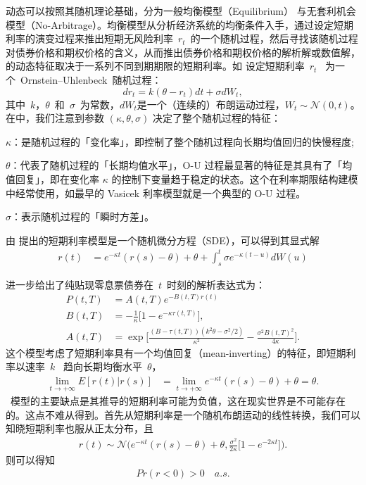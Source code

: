 动态\tsm 可以按照其随机理论基础，分为一般均衡模型（Equilibrium） 与无套利机会模型（No-Arbitrage）。均衡模型从分析经济系统的均衡条件入手，通过设定短期利率的演变过程来推出短期无风险利率~$r_t$~的一个随机过程，然后寻找该随机过程对债券价格和期权价格的含义，从而推出债券价格和期权价格的解析解或数值解，\ts 的动态特征取决于一系列不同到期期限的短期利率。如 设定短期利率~$r_t$~ 为一个~Ornstein–Uhlenbeck~随机过程：
\begin{equation}
  dr_t = k(\theta-r_t)dt + \sigma d W_t, \label{vasicek-model}
\end{equation}
其中~$k$，$\theta$~和~$\sigma$~为常数，$d W_t$是一个（连续的）布朗运动过程，$W_t \sim \mathcal{N} (0, t)$。
在中，我们注意到参数 $(\kappa, \theta, \sigma)$ 决定了整个随机过程的特征：
\begin{compactitem}
 \item $\kappa$：是随机过程的「变化率」，即控制了整个随机过程向长期均值回归的快慢程度;
 \item $\theta$：代表了随机过程的「长期均值水平」，O-U 过程最显著的特征是其具有了「均值回复」，即在变化率 $\kappa$ 的控制下变量趋于稳定的状态。这个在利率期限结构建模中经常使用，如最早的 Vasicek 利率模型就是一个典型的 O-U 过程。
 \item $\sigma$：表示随机过程的「瞬时方差」。
\end{compactitem} 

由 \citeauthor{vasicek1977equilibrium} 提出的短期利率模型是一个随机微分方程（SDE），可以得到其显式解
\begin{align}
r(t)  &= e^{-\kappa t} (r(s)-\theta) + \theta + \int_{s}^{t}  \sigma  e^{-\kappa (t-u)} dW(u)  \label{vasicek-rate}
\end{align}

\citeauthor{vasicek1977equilibrium} 进一步给出了纯贴现零息票债券在~$t$~时刻的解析表达式为： 
\begin{align*}
  P(t,T) &= A(t, T) e^{-B(t,T) r(t)}\\
  B(t, T) &= -\frac{1}{\kappa} \Big[ 1 - e^{-\kappa \tau(t,T)} \Big],\\
  A(t, T) &= \exp{\Big[
       \frac{(B-\tau(t,T))(k^2 \theta -\sigma^2/2)}{\kappa^2}
       - \frac{\sigma^2 B(t,T)^2}{4\kappa}
              \Big]}.
\end{align*}
这个模型考虑了短期利率具有一个均值回复（mean-inverting）的特征，即短期利率以速率~$k$~ 趋向长期均衡水平~$\theta$，
 \begin{align}
 \lim_{t \rightarrow + \infty }  E[r(t)|r(s)] &= \lim_{t \rightarrow + \infty }  e^{-\kappa t} (r(s)-\theta) + \theta = \theta. 
 \end{align}
\citeauthor{vasicek1977equilibrium}~模型的主要缺点是其推导的短期利率可能为负值，这在现实世界是不可能存在的。这点不难从得到。首先从短期利率是一个随机布朗运动的线性转换，我们可以知晓短期利率也服从正太分布，且
\begin{align}
 r(t) \sim \mathcal{N}\Bigg( e^{-\kappa t} (r(s)-\theta) + \theta , \frac{\sigma^2}{2\kappa} \big[ 1 - e^{ -2\kappa t }\big]  \Bigg).
\end{align}
则可以得知
\begin{align}
Pr(r<0) >0 \quad a.s.
\end{align}

